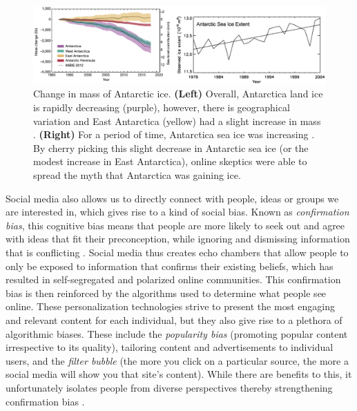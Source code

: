 \documentclass{article}
\begin{document}
\begin{figure}[h]
    \includegraphics[width=.99 \textwidth]{./images/Antartica_sea_ice.png}
    \centering
    \caption{Change in mass of Antarctic ice. \textbf{(Left)} Overall, Antarctica land ice is rapidly decreasing (purple), however, there is geographical variation and East Antarctica (yellow) had a slight increase in mass \cite{shepherd2018mass}. \textbf{(Right)} For a period of time, Antarctica sea ice was increasing \cite{zhang2007increasing}. By cherry picking this slight decrease in Antarctic sea ice (or the modest increase in East Antarctica), online skeptics were able to spread the myth that Antarctica was gaining ice.}
    \label{Antartica_sea_ice}
\end{figure}

Social media also allows us to directly connect with people, ideas or groups we are interested in, which gives rise to a kind of social bias. Known as \textit{confirmation bias}, this cognitive bias means that people are more likely to seek out and agree with ideas that fit their preconception, while ignoring and dismissing information that is conflicting \cite{cognitivebias2021}. Social media thus creates echo chambers that allow people to only be exposed to information that confirms their existing beliefs, which has resulted in self-segregated and polarized online communities. This confirmation bias is then reinforced by the algorithms used to determine what people see online. These personalization technologies strive to present the most engaging and relevant content for each individual, but they also give rise to a plethora of algorithmic biases. These include the \textit{popularity bias} (promoting popular content irrespective to its quality), tailoring content and advertisements to individual users, and the \textit{filter bubble} (the more you click on a particular source, the more a social media will show you that site’s content). While there are benefits to this, it unfortunately isolates people from diverse perspectives thereby strengthening confirmation bias \cite{scientificamerican2018biassocialmedia}.
\end{document}
